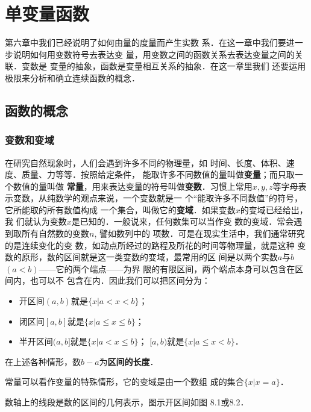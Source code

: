 \chapter{单变量函数}
第六章中我们已经说明了如何由量的度量而产生实数
系．在这一章中我们要进一步说明如何用变数符号去表达变
量，用变数之间的函数关系去表达变量之间的关联．变数是
变量的抽象，函数是变量相互关系的抽象．在这一章里我们
还要运用极限来分析和确立连续函数的概念．

\section{函数的概念}
\subsection{变数和变域}
在研究自然现象时，人们会遇到许多不同的物理量，如
时间、长度、体积、速度、质量、力等等．按照给定条件，
能取许多不同数值的量叫做\textbf{变量}；而只取一个数值的量叫做
\textbf{常量}，用来表达变量的符号叫做\textbf{变数}．习惯上常用$x,y,
z$等字母表示变数，从纯数学的观点来说，一个变数就是一
个“能取许多不同数值”的符号，它所能取的所有数值构成
一个集合，叫做它的\textbf{变域}．如果变数$x$的变域已经给出，我
们就认为变数$x$是已知的．一般说来，任何数集可以当作变
数的变域．常会遇到取所有自然数的变数$n$, 譬如数列中的
项数．可是在现实生活中，我们通常研究的是连续变化的变
数，如动点所经过的路程及所花的时间等物理量，就是这种
变数的原形，数的区间就是这一类变数的变域，最常用的区
间是以两个实数$a$与$b$ $(a<b)$——它的两个端点——为界
限的有限区间，两个端点本身可以包含在区间内，也可以不
包含在内．因此我们可以把区间分为：
\begin{itemize}
    \item 开区间$(a,b)$就是$\{x|a<x<b\}$；
    \item  闭区间$[a,b]$就是$\{x|a\le x\le b\}$；
    \item  半开区间$(a,b]$就是$\{x|a<x\le b\}$；
    $[a,b)$就是$\{x|a\le x<b\}$．
\end{itemize}
在上述各种情形，数$b-a$为\textbf{区间的长度}．

常量可以看作变量的特殊情形，它的变域是由一个数组
成的集合$\{x|x=a\}$．

数轴上的线段是数的区间的几何表示，图示开区间如图
8.1或8.2．

